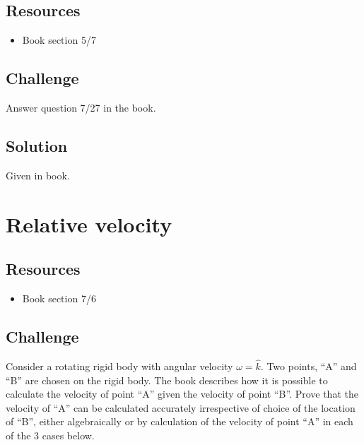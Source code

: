 \subsection*{Resources}
\begin{itemize}
    \item Book section 5/7
\end{itemize}

\subsection*{Challenge}
Answer question 7/27 in the book.

\subsection*{Solution}
Given in book.




%
%




\newpage
\section{Relative velocity}

\subsection*{Resources}
\begin{itemize}
    \item Book section 7/6
\end{itemize}

\subsection*{Challenge}
Consider a rotating rigid body with angular velocity $\omega=\hat{k}$. Two points, ``A'' and ``B'' are chosen on the rigid body. The book describes how it is possible to calculate the velocity of point ``A'' given the velocity of point ``B''. Prove that the velocity of ``A'' can be calculated accurately irrespective of choice of the location of ``B'', either algebraically or by calculation of the velocity of point ``A'' in each of the 3 cases below.

